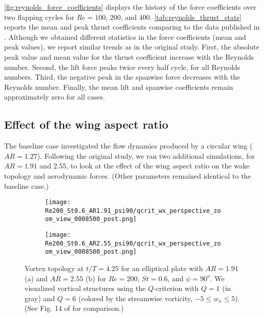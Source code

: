 \cref{fig:reynolds_force_coefficients} displays the history of the force coefficients over two flapping cycles for  $Re =100$, $200$, and $400$.
\cref{tab:reynolds_thrust_stats} reports the mean and peak thrust coefficients comparing to the data published in \citet{li_dong_2016}.
Although we obtained different statistics in the force coefficients (mean and peak values), we report similar trends as in the original study.
First, the absolute peak value and mean value for the thrust coefficient increase with the Reynolds number.
Second, the lift force peaks twice every half cycle, for all Reynolds numbers.
Third, the negative peak in the spanwise force decreases with the Reynolds number.
Finally, the mean lift and spanwise coefficients remain approximately zero for all cases.

\subsection{Effect of the wing aspect ratio}

The baseline case investigated the flow dynamics produced by a circular wing ($AR = 1.27$).
Following the original study, we ran two additional simulations, for $AR = 1.91$ and $2.55$, to look at the effect of the wing aspect ratio on the wake topology and aerodynamic forces.
(Other parameters remained identical to the baseline case.)

\begin{figure}[!h]
  \centering
  \begin{subfigure}[c]{0.45\textwidth}
    \centering
    \texttt{[image: Re200\_St0.6\_AR1.91\_psi90/qcrit\_wx\_perspective\_zoom\_view\_0008500\_post.png]}
    \caption{}
    \label{fig:ratio_wake_topology:1.91_perspective}
  \end{subfigure}
  \hfill
  \begin{subfigure}[c]{0.45\textwidth}
    \centering
    \texttt{[image: Re200\_St0.6\_AR2.55\_psi90/qcrit\_wx\_perspective\_zoom\_view\_0008500\_post.png]}
    \caption{}
    \label{fig:ratio_wake_topology:2.55_perspective}
  \end{subfigure}
  \caption{Vortex topology at $t / T = 4.25$ for an elliptical plate with $AR = 1.91$ (a) and $AR = 2.55$ (b) for $Re = 200$, $St = 0.6$, and $\psi = 90^o$. We visualized vortical structures using the $Q$-criterion with $Q = 1$ (in gray) and $Q = 6$ (colored by the streamwise vorticity, $-5 \leq w_x \leq 5$). (See Fig. 14 of \citet{li_dong_2016} for comparison.)}
  \label{fig:ratio_wake_topology}
\end{figure}


